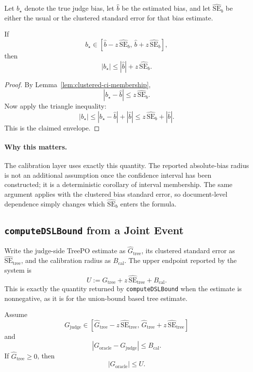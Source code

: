 Let $b_\star$ denote the true judge bias, let $\widehat b$ be the estimated
bias, and let $\widehat{\mathrm{SE}}_b$ be either the usual or the clustered
standard error for that bias estimate.

\begin{corollary}
\label{cor:abs-bias-envelope}
If
\[
b_\star \in
\left[
\widehat b-z\,\widehat{\mathrm{SE}}_b,\,
\widehat b+z\,\widehat{\mathrm{SE}}_b
\right],
\]
then
\[
|b_\star|
\le
|\widehat b| + z\,\widehat{\mathrm{SE}}_b.
\]
\end{corollary}

\begin{proof}
By Lemma~\ref{lem:clustered-ci-membership},
\[
|b_\star-\widehat b| \le z\,\widehat{\mathrm{SE}}_b.
\]
Now apply the triangle inequality:
\[
|b_\star|
\le
|b_\star-\widehat b| + |\widehat b|
\le
z\,\widehat{\mathrm{SE}}_b + |\widehat b|.
\]
This is the claimed envelope.
\end{proof}

\paragraph{Why this matters.}
The calibration layer uses exactly this quantity. The reported absolute-bias
radius is not an additional assumption once the confidence interval has been
constructed; it is a deterministic corollary of interval membership. The same
argument applies with the clustered bias standard error, so document-level
dependence simply changes which $\widehat{\mathrm{SE}}_b$ enters the formula.

\subsection{\texttt{computeDSLBound} from a Joint Event}

Write the judge-side TreePO estimate as $\widehat G_{\mathrm{tree}}$, its
clustered standard error as $\widehat{\mathrm{SE}}_{\mathrm{tree}}$, and the
calibration radius as $B_{\mathrm{cal}}$. The upper endpoint reported by the
system is
\[
U
:=
\widehat G_{\mathrm{tree}}
 + z\,\widehat{\mathrm{SE}}_{\mathrm{tree}}
 + B_{\mathrm{cal}}.
\]
This is exactly the quantity returned by \texttt{computeDSLBound} when the
estimate is nonnegative, as it is for the union-bound based tree estimate.

\begin{theorem}
\label{thm:joint-interval-calibration}
Assume
\[
G_{\mathrm{judge}}
\in
\left[
\widehat G_{\mathrm{tree}} - z\,\widehat{\mathrm{SE}}_{\mathrm{tree}},\,
\widehat G_{\mathrm{tree}} + z\,\widehat{\mathrm{SE}}_{\mathrm{tree}}
\right]
\]
and
\[
|G_{\mathrm{oracle}} - G_{\mathrm{judge}}| \le B_{\mathrm{cal}}.
\]
If $\widehat G_{\mathrm{tree}} \ge 0$, then
\[
|G_{\mathrm{oracle}}| \le U.
\]
\end{theorem}

